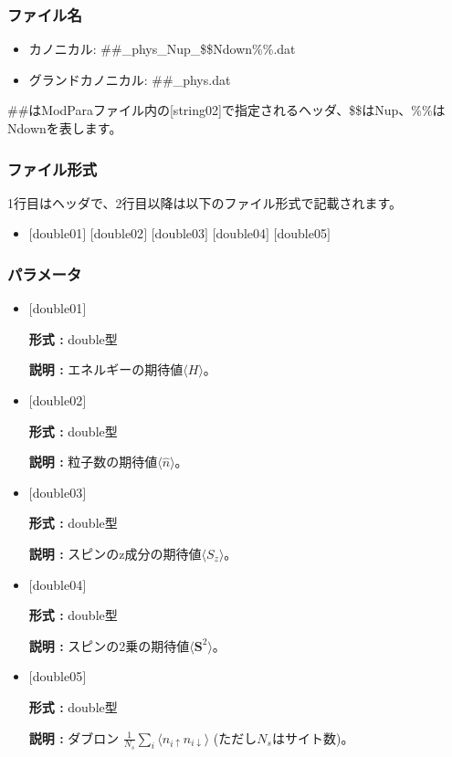 \subsubsection{ファイル名}
\begin{itemize}
   \item {カノニカル:} \#\#\_phys\_Nup\_\$\$Ndown\%\%.dat
   \item {グランドカノニカル:} \#\#\_phys.dat
 \end{itemize}
  \#\#はModParaファイル内の[string02]で指定されるヘッダ、\$\$はNup、\%\%はNdownを表します。

\subsubsection{ファイル形式}
1行目はヘッダで、2行目以降は以下のファイル形式で記載されます。
 \begin{itemize}
   \item $[$double01$]$ $[$double02$]$ $[$double03$]$ $[$double04$]$ $[$double05$]$
  \end{itemize}
\subsubsection{パラメータ}
 \begin{itemize}

  \item  $[$double01$]$
  
 {\bf 形式 :} double型

{\bf 説明 :} エネルギーの期待値$\langle H\rangle$。
 
  \item $[$double02$]$

 {\bf 形式 :} double型 

{\bf 説明 :}  粒子数の期待値$\langle \hat{n}\rangle$。

  \item $[$double03$]$

 {\bf 形式 :} double型 

{\bf 説明 :}  スピンのz成分の期待値$\langle S_z\rangle$。

  \item $[$double04$]$

 {\bf 形式 :} double型 

{\bf 説明 :}  スピンの2乗の期待値$\langle {\bm S}^2\rangle$。

  \item $[$double05$]$

 {\bf 形式 :} double型 

{\bf 説明 :}  ダブロン
$\frac{1}{N_s} \sum_{i}\langle n_{i\uparrow}n_{i\downarrow}\rangle$ (ただし$N_s$はサイト数)。


 \end{itemize}


